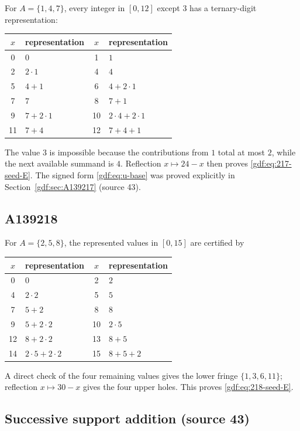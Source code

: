 \documentclass[11pt,a4paper]{article}
\numberwithin{equation}{section}
\theoremstyle{definition}
\theoremstyle{remark}
\theoremstyle{plain}
\newcommand{\src}[1]{\textup{(source #1)}}
\begin{document}
For $A=\{1,4,7\}$, every integer in $[0,12]$ except $3$ has a ternary-digit
representation:
\begin{center}
\begin{tabular}{c|l@{\qquad}c|l}
\toprule
$x$ & representation & $x$ & representation\\
\midrule
0 & $0$ & 1 & $1$\\
2 & $2\cdot1$ & 4 & $4$\\
5 & $4+1$ & 6 & $4+2\cdot1$\\
7 & $7$ & 8 & $7+1$\\
9 & $7+2\cdot1$ & 10 & $2\cdot4+2\cdot1$\\
11 & $7+4$ & 12 & $7+4+1$\\
\bottomrule
\end{tabular}
\end{center}
The value $3$ is impossible because the contributions from $1$ total at most
$2$, while the next available summand is $4$.  Reflection $x\mapsto24-x$
then proves \eqref{gdf:eq:217-seed-E}.  The signed form
\eqref{gdf:eq:u-base} was proved explicitly in Section~\ref{gdf:sec:A139217}
\src{43}.

\subsection{A139218}

For $A=\{2,5,8\}$, the represented values in $[0,15]$ are certified by
\begin{center}
\begin{tabular}{c|l@{\qquad}c|l}
\toprule
$x$ & representation & $x$ & representation\\
\midrule
0 & $0$ & 2 & $2$\\
4 & $2\cdot2$ & 5 & $5$\\
7 & $5+2$ & 8 & $8$\\
9 & $5+2\cdot2$ & 10 & $2\cdot5$\\
12 & $8+2\cdot2$ & 13 & $8+5$\\
14 & $2\cdot5+2\cdot2$ & 15 & $8+5+2$\\
\bottomrule
\end{tabular}
\end{center}
A direct check of the four remaining values gives the lower fringe
$\{1,3,6,11\}$; reflection $x\mapsto30-x$ gives the four upper holes.
This proves \eqref{gdf:eq:218-seed-E}.

\subsection{Successive support addition \src{43}}
\end{document}
